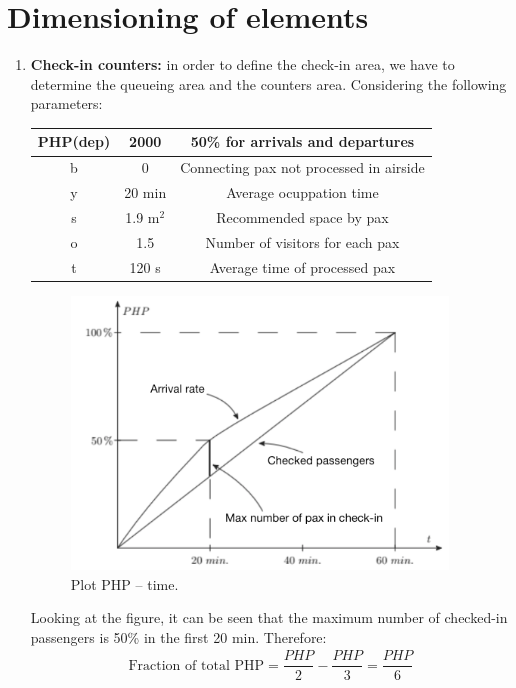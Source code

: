 	\section{Dimensioning of elements}
\begin{enumerate}
\item \textbf{Check-in counters:} in order to define the check-in area, we have to determine the queueing area and the counters area. Considering the following parameters:
\begin{table}[H]
\centering
\begin{tabular}{|c|c|c|}
\hline
PHP(dep) & 2000 & 50\% for arrivals and departures\\
\hline 
b & 0 & Connecting pax not processed in airside\\
\hline
y & 20 min & Average ocuppation time\\
\hline 
s & 1.9 $\mathrm{m^2}$ & Recommended space by pax\\
\hline
o & 1.5 & Number of visitors for each pax\\
\hline 
t & 120 s & Average time of processed pax\\
\hline
\end{tabular}
\end{table}

\begin{figure}[H]
	\centering
\includegraphics[width=10cm]{./images/graf1}
\caption{Plot PHP -- time.}
\end{figure}

Looking at the figure, it can be seen that the maximum number of checked-in passengers is 50\% in the first 20 min. Therefore:
\begin{align*}
\text{Fraction of total PHP} = \dfrac{PHP}{2}-\dfrac{PHP}{3}=\dfrac{PHP}{6}
\end{align*}


\end{enumerate}
